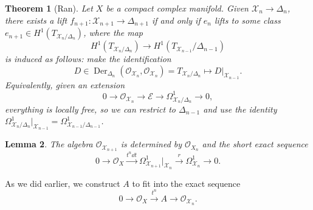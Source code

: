\documentclass[leqno, openany]{memoir}
\newtheorem{thm}{Theorem}[section]
\newtheorem{lem}[thm]{Lemma}
\theoremstyle{definition}
\theoremstyle{remark}
\theoremstyle{plain}
\theoremstyle{definition}
\theoremstyle{remark}
\newcommand{\mc}[1]{\mathcal{#1}}
\DeclareMathOperator{\Der}{Der}
\begin{document}
\begin{thm}[Ran]
    Let $X$ be a compact complex manifold. Given $\mc{X}_n \to \Delta_n$, there exists a lift $f_{n+1} \colon \mc{X}_{n+1} \to \Delta_{n+1}$ if and only if $e_n$ lifts to some class $e_{n+1} \in H^1(T_{\mc{X}_n/\Delta_n})$, where the map
    \[ H^1(T_{\mc{X}_n / \Delta_n}) \to H^1(T_{\mc{X}_{n-1}} / \Delta_{n-1}) \]
    is induced as follows: make the identification
    \[ D \in \Der_{\Delta_n}(\mc{O}_{\mc{X}_n}, \mc{O}_{\mc{X}_n}) = T_{\mc{X}_n/\Delta_n} \mapsto D |_{\mc{X}_{n-1}}. \]
    Equivalently, given an extension
    \[ 0 \to \mc{O}_{\mc{X}_n} \to \mc{E} \to \Omega^1_{\mc{X}_n/\Delta_n} \to 0, \]
    everything is locally free, so we can restrict to $\Delta_{n-1}$ and use the identity $\Omega^1_{\mc{X}_n/\Delta_n} |_{\mc{X}_{n-1}} = \Omega^1_{\mc{X}_{n-1}/\Delta_{n-1}}$.
\end{thm}

\begin{lem}
    The algebra $\mc{O}_{\mc{X}_{n+1}}$ is determined by $\mc{O}_{X_n}$ and the short exact sequence
    \[ 0 \to \mc{O}_X \xrightarrow{t^{n} \dd{t}} \Omega^1_{\mc{X}_{n+1}}|_{\mc{X}_n} \xrightarrow{r} \Omega^1_{\mc{X}_n} \to 0. \]
\end{lem}

As we did earlier, we construct $A$ to fit into the exact sequence
\[ 0 \to \mc{O}_X \xrightarrow{t^n} A \to \mc{O}_{\mc{X}_n}. \]
\end{document}
